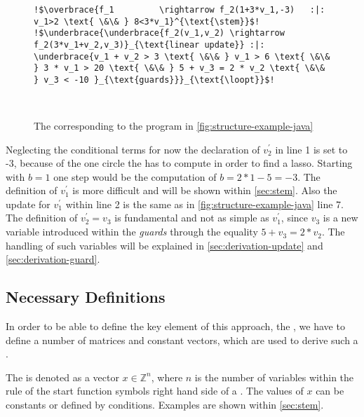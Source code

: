 \begin{figure}[H]
	
	\begin{lstlisting}[linewidth=1.2\textwidth, escapechar = !]
!$\overbrace{f_1	     \rightarrow f_2(1+3*v_1,-3)   :|: v_1>2 \text{ \&\& } 8<3*v_1}^{\text{\stem}}$!
!$\underbrace{\underbrace{f_2(v_1,v_2) \rightarrow f_2(3*v_1+v_2,v_3)}_{\text{linear update}} :|: \underbrace{v_1 + v_2 > 3 \text{ \&\& } v_1 > 6 \text{ \&\& } 3 * v_1 > 20 \text{ \&\& } 5 + v_3 = 2 * v_2 \text{ \&\& } v_3 < -10 }_{\text{guards}}}_{\text{\loopt}}$!

	
	\end{lstlisting}

	\caption{The \its corresponding to the  program in \autoref{fig:structure-example-java}}
	\label{fig:structure-example-TRS}
\end{figure}
 Neglecting the conditional terms for now the declaration of $v^\prime_2$ in line 1 is set to -3, because of the one circle the \seg has to compute in order to find a lasso. Starting with $b=1$ one step would be the computation of $b = 2*1-5=-3$. The definition of $v^\prime_1$ is more difficult and will be shown within \autoref{sec:stem}.
Also the update for $v^\prime_1$ within line 2 is the same as in \autoref{fig:structure-example-java} line 7. The definition of $v^\prime_2 = v_3$ is fundamental and not as simple as $v^\prime_1$, since $v_3$ is a new variable introduced within the \textit{guards} through the equality $5+v_3=2*v_2$. The handling of such variables will be explained in \autoref{sec:derivation-update} and \autoref{sec:derivation-guard}. \newline

\subsection{Necessary Definitions}
In order to be able to define the key element of this approach, the \gna, we have to define a number of matrices and constant vectors, which are used to derive such a \gna. 

\begin{definition}[\stem]
	The \stem is denoted as a vector $x \in \mathbb{Z}^n$, where $n$ is the number of variables within the rule of the start function symbols right hand side of a \its. The values of $x$ can be constants or defined by conditions. Examples are shown within \autoref{sec:stem}.
\end{definition}


